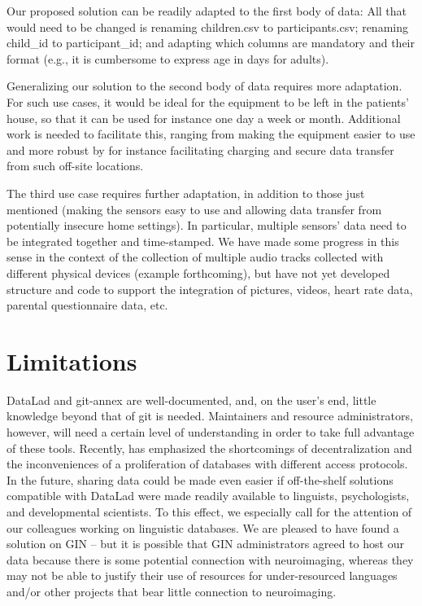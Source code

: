 \documentclass[smallextended]{svjour3}       %
\begin{document}
Our proposed solution can be readily adapted to the first body of data: All that would need to be changed is renaming children.csv to participants.csv; renaming child\_id to participant\_id; and adapting which columns are mandatory and their format (e.g., it is cumbersome to express age in days for adults).

Generalizing our solution to the second body of data requires more adaptation. For such use cases, it would be ideal for the equipment to be left in the patients' house, so that it can be used for instance one day a week or month. Additional work is needed to facilitate this, ranging from making the equipment easier to use and more robust by for instance facilitating charging and secure data transfer from such off-site locations.

The third use case requires further adaptation, in addition to those just mentioned (making the sensors easy to use and allowing data transfer from potentially insecure home settings). In particular, multiple sensors' data need to be integrated together and time-stamped. We have made some progress in this sense in the context of the collection of multiple audio tracks collected with different physical devices (example forthcoming), but have not yet developed structure and code to support the integration of pictures, videos, heart rate data, parental questionnaire data, etc. 

\section{Limitations}

DataLad and git-annex are well-documented, and, on the user's end, little knowledge beyond that of git is needed. Maintainers and resource administrators, however, will need a certain level of understanding in order to take full advantage of these tools.
Recently, \citet{Powell2021} has emphasized the shortcomings of decentralization and the inconveniences of a proliferation of databases with different access protocols. In the future, sharing data could be made even easier if off-the-shelf solutions compatible with DataLad were made readily available to linguists, psychologists, and developmental scientists. To this effect, we especially call for the attention of our colleagues working on linguistic databases. We are pleased to have found a solution on GIN -- but it is possible that GIN administrators agreed to host our data because there is some potential connection with neuroimaging, whereas they may not be able to justify their use of resources for under-resourced languages and/or other projects that bear little connection to neuroimaging.
\end{document}
